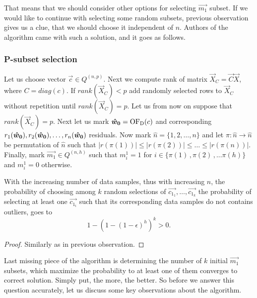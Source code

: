 That means that we should consider other options for selecting $\vec{m_1}$ subset. If we would like to continue with selecting some random subsets, previous observation gives us a clue, that we should choose it independent of $n$. Authors of the algorithm came with such a solution, and it goes as follows.



\subsubsection*{P-subset selection} \label{section:random:p:samples}

Let us choose vector $\vec{c} \in Q^{(n, p)}$. 
Next we compute rank of matrix $\vec{X}_{C} = \vec{C}\vec{X}$, where $C = diag(c)$. If $rank(\vec{X}_{C}) < p$ add randomly selected rows to $\vec{X}_{C}$ without repetition until $rank(\vec{X}_{C}) = p$. Let us from now on suppose that $rank(\vec{X}_{C}) = p$. Next let us mark $\boldsymbol{\hat{w}_0} = \operatorname{OF_D}(c)$ and corresponding $r_1(\boldsymbol{\hat{w}_0}), r_2(\boldsymbol{\hat{w}_0}), \ldots ,r_n(\boldsymbol{\hat{w}_0})$ residuals.  Now mark $\hat{n} = \{{1,2,\ldots,n\}}$ and let
$\pi: \hat{n} \rightarrow \hat{n}$ be permutation of $\hat{n}$ such that $|r({\pi(1)})| \leq |r({\pi(2)})| \leq \ldots \leq |r({\pi(n)})|$. 
 Finally, mark $\vec{m_1} \in Q^{(n,h)}$  such that $m^1_i = 1$ for $i \in \{{\pi(1)\,, \pi(2)\,,... \pi(h)\}}$ and  $m^1_i = 0$  otherwise.

\begin{observation} \label{prandomsamples}
    With the increasing number of data samples, thus with increasing $n$, the probability of choosing among $k$ random selections of $\vec{c_{1_1}}, \ldots, \vec{c_{1_k}}$ the probability of selecting at least one $\vec{c_{1_i}}$ such that its corresponding data samples do not contains outliers, goes to
\begin{equation}
    1-(1-(1-\epsilon)^h)^k  > 0.
\end{equation}
\end{observation}

\begin{proof}
    Similarly as in previous observation.
\end{proof}

Last missing piece of the algorithm is determining the number of $k$ initial $\vec{m_1}$ subsets, which maximize the probability to at least one of them converges to correct solution. Simply put, the more, the better. So before we answer this question accurately, let us discuss some key observations about the algorithm.

